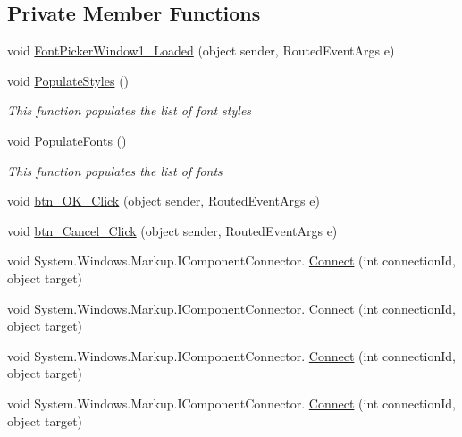 \subsection*{Private Member Functions}
\begin{DoxyCompactItemize}
\item 
void \hyperlink{class_c_p_u___o_s___simulator_1_1_font_picker_window_a0907f73fb52351e43b76af4137509f41}{Font\+Picker\+Window1\+\_\+\+Loaded} (object sender, Routed\+Event\+Args e)
\item 
void \hyperlink{class_c_p_u___o_s___simulator_1_1_font_picker_window_a79525d7a77c191f63187e5a8181bd197}{Populate\+Styles} ()
\begin{DoxyCompactList}\small\item\em This function populates the list of font styles \end{DoxyCompactList}\item 
void \hyperlink{class_c_p_u___o_s___simulator_1_1_font_picker_window_a4042c1d9dedbbd9abb956fc7b97c1564}{Populate\+Fonts} ()
\begin{DoxyCompactList}\small\item\em This function populates the list of fonts \end{DoxyCompactList}\item 
void \hyperlink{class_c_p_u___o_s___simulator_1_1_font_picker_window_a6d659d671c24e1beed969f2d36d669d8}{btn\+\_\+\+O\+K\+\_\+\+Click} (object sender, Routed\+Event\+Args e)
\item 
void \hyperlink{class_c_p_u___o_s___simulator_1_1_font_picker_window_a6e5279d2116523168362cb740eac5e55}{btn\+\_\+\+Cancel\+\_\+\+Click} (object sender, Routed\+Event\+Args e)
\item 
void System.\+Windows.\+Markup.\+I\+Component\+Connector. \hyperlink{class_c_p_u___o_s___simulator_1_1_font_picker_window_ac5f7c5cad6bf2d8dc79c7e59f5a125da}{Connect} (int connection\+Id, object target)
\item 
void System.\+Windows.\+Markup.\+I\+Component\+Connector. \hyperlink{class_c_p_u___o_s___simulator_1_1_font_picker_window_ac5f7c5cad6bf2d8dc79c7e59f5a125da}{Connect} (int connection\+Id, object target)
\item 
void System.\+Windows.\+Markup.\+I\+Component\+Connector. \hyperlink{class_c_p_u___o_s___simulator_1_1_font_picker_window_ac5f7c5cad6bf2d8dc79c7e59f5a125da}{Connect} (int connection\+Id, object target)
\item 
void System.\+Windows.\+Markup.\+I\+Component\+Connector. \hyperlink{class_c_p_u___o_s___simulator_1_1_font_picker_window_ac5f7c5cad6bf2d8dc79c7e59f5a125da}{Connect} (int connection\+Id, object target)
\end{DoxyCompactItemize}
